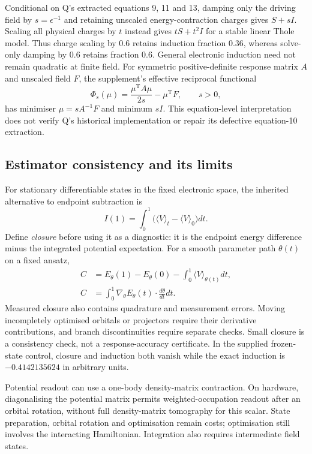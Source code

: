 \documentclass{article}
\begin{document}
Conditional on Q's extracted equations 9, 11 and 13, damping only the driving field by $s=\epsilon^{-1}$ and retaining unscaled energy-contraction charges gives $S+sI$. Scaling all physical charges by $t$ instead gives $tS+t^2I$ for a stable linear Thole model. Thus charge scaling by 0.6 retains induction fraction 0.36, whereas solve-only damping by 0.6 retains fraction 0.6. General electronic induction need not remain quadratic at finite field. For symmetric positive-definite response matrix $A$ and unscaled field $F$, the supplement's effective reciprocal functional
\begin{equation*}
\Phi_s(\mu)=\frac{\mu^{\mathrm T}A\mu}{2s}-\mu^{\mathrm T}F,\qquad s>0,
\end{equation*}
has minimiser $\mu=sA^{-1}F$ and minimum $sI$. This equation-level interpretation does not verify Q's historical implementation or repair its defective equation-10 extraction.

\subsection{Estimator consistency and its limits}

For stationary differentiable states in the fixed electronic space, the inherited alternative to endpoint subtraction is
\begin{equation*}
I(1)=\int_0^1\bigl(\langle V\rangle_t-\langle V\rangle_0\bigr)dt.
\end{equation*}
Define \emph{closure} before using it as a diagnostic: it is the endpoint energy difference minus the integrated potential expectation. For a smooth parameter path $\theta(t)$ on a fixed ansatz,
\begin{align*}
C&=E_\theta(1)-E_\theta(0)-\int_0^1\langle V\rangle_{\theta(t)}dt,\\
C&=\int_0^1\nabla_\theta E_\theta(t)\cdot\frac{d\theta}{dt}dt.
\end{align*}
Measured closure also contains quadrature and measurement errors. Moving incompletely optimised orbitals or projectors require their derivative contributions, and branch discontinuities require separate checks. Small closure is a consistency check, not a response-accuracy certificate. In the supplied frozen-state control, closure and induction both vanish while the exact induction is $-0.4142135624$ in arbitrary units.

Potential readout can use a one-body density-matrix contraction. On hardware, diagonalising the potential matrix permits weighted-occupation readout after an orbital rotation, without full density-matrix tomography for this scalar. State preparation, orbital rotation and optimisation remain costs; optimisation still involves the interacting Hamiltonian. Integration also requires intermediate field states.
\end{document}
